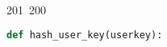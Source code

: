 201~200~\documentclass{article}
\begin{document}
	                                                                                                                                                                                                                                                                                                	                                                                                                                                        	    	                                                                                                	                                                                                                                                                                                                                                                                                                        \begin{lstlisting}[language=Python, caption=Key Derivation with HKDF]
	                                                                                                                                                                                                                                                                                                	                                                                                                                                        	    	                                                                                                	                                                                                                                                                                                                                                                                                                        def hash_user_key(userkey):
	                                                                                                                                                                                                                                                                                                	                                                                                                                                        	    	                                                                                                	                                                                                                                                                                                                                                                                                                            """

\end{lstlisting}
\end{document}
